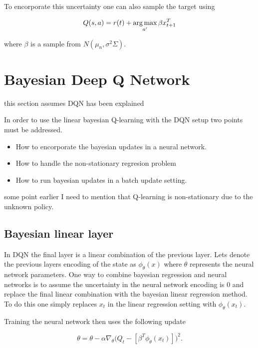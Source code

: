 To encorporate this uncertainty one can also sample the target using

\begin{equation*}
    Q(s,a) = r(t) + \operatorname*{arg\,max}_{a'} \beta x_{t+1}^T
\end{equation*}

where $\beta$ is a sample from $N(\mu_n, \sigma^2\Sigma)$.

\section{Bayesian Deep Q Network}

\todo this section assumes DQN has been explained

In order to use the linear bayesian Q-learning with the DQN setup two points must be addressed.

\begin{itemize}
    \item How to encorporate the bayesian updates in a neural network.
    \item How to handle the non-stationary regresion problem
    \item How to run bayesian updates in a batch update setting.
\end{itemize}

\todo some point earlier I need to mention that Q-learning is non-stationary due to the unknown policy.

\subsection{Bayesian linear layer}

In DQN the final layer is a linear combination of the previous layer. Lets denote the previous layers encoding of the state as $\phi_\theta(x)$ where $\theta$ represents the neural network parameters. One way to combine bayesian regression and neural networks is to assume the uncertainty in the neural network encoding is 0 and replace the final linear combination with the bayesian linear regression method. To do this one simply replaces $x_t$ in the linear regression setting with $\phi_\theta(x_t)$.

Training the neural network then uses the following update

\begin{equation*}
\theta = \theta - \alpha\nabla_\theta\big(Q_t - [\beta^T\phi_\theta(x_t)]\big)^2.
\end{equation*}

